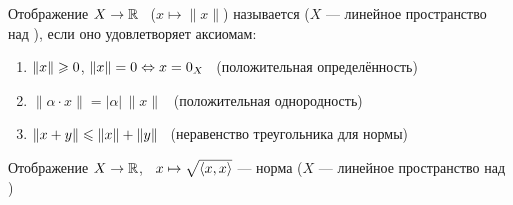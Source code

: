 \begin{opr} %
	Отображение $X \to \mathbb R$ \ {\small($x \mapsto \|x\|$)} называется  {\small($X$ --- линейное пространство над \rr)}, если оно удовлетворяет аксиомам:
	\begin{enumerate} %
		\item\label{норма:пол.опр.} 
		$\|x\| \geqslant 0$, \quad $\|x\| = 0 \Leftrightarrow x = 0_X$
		\ {\footnotesize(положительная определённость)}
		
		\item {}
		$\|\alpha \cdot x\| = |\alpha|\,\|x\|$
		\ {\footnotesize(положительная однородность)}
		
		\item\label{норма:нер.тр.} 
		$\|x + y\| \leqslant \|x\| + \|y\|$
		\ {\footnotesize(неравенство треугольника для нормы)}
	\end{enumerate} %
\end{opr} %

\begin{utv}\label{норма:скал.пр.} %
	Отображение $X \to \mathbb R$, \ $x \mapsto \sqrt{\left<x, x\right>}$ --- норма {\small($X$ --- линейное пространство над \rr)}
\end{utv}

